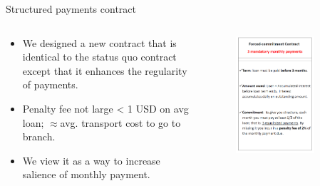 \documentclass[9pt, aspectratio=169]{beamer}
\begin{document}
\begin{frame}{Structured payments contract}
\begin{columns}
\begin{column}{.45\textwidth}
   \begin{itemize}
       \vfill \item We designed a new contract that is identical to the status quo contract except that it enhances the regularity of payments.
       \vspace{.2in}
       \vfill \item Penalty fee not large < 1 USD on avg loan; $\approx$avg. transport cost to go to branch.
       \vspace{.2in}
       \vfill \item We view it as a way to increase salience of monthly payment.
    \end{itemize}
    \end{column}
\begin{column}{.45\textwidth}
    \vspace{-.3in}
        \begin{figure}[H]
            \includegraphics[width=0.78\textwidth]{Figuras/fc_contract.png}
        \end{figure}
    \end{column}
    \end{columns}
\end{frame}
\end{document}

